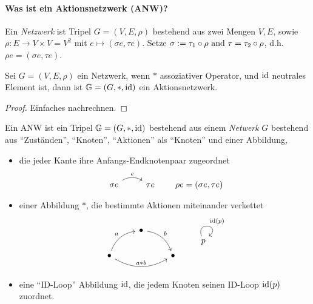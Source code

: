 \paragraph{Was ist ein Aktionsnetzwerk (ANW)?}
\begin{definition}
    Ein \emph{Netzwerk} ist Tripel $G = (V,E,\rho)$ bestehend aus zwei Mengen $V,E$, sowie $\rho \colon E \to V\times V = V^2$ mit $e \mapsto (\sigma e,\tau e)$.
    Setze $\sigma := \tau_1 \circ \rho \text{ and } \tau = \tau_2 \circ \rho$, d.h. $\rho e = (\sigma e, \tau e)$.
\end{definition}
\begin{satz}
    Sei $G = (V,E,\rho)$ ein Netzwerk, wenn $\ast$ assoziativer Operator, und $\operatorname{id}$ neutrales Element ist, dann ist $\mathbb{G} = (G,\ast, \operatorname{id})$ ein Aktionsnetzwerk.
\end{satz}
\begin{proof}
    Einfaches nachrechnen. 
\end{proof}
Ein ANW ist ein Tripel $\mathbb{G} = (G,\ast, \operatorname{id})$ bestehend aus einem \emph{Netwerk} $G$ bestehend aus ``Zuständen'', ``Knoten'', ``Aktionen'' als ``Knoten'' und einer Abbildung, 
\begin{itemize}
    \item die jeder Kante ihre Anfangs-Endknotenpaar zugeordnet
        $$
        \begin{tikzcd}
            \sigma e \arrow[r, "e", bend left] & \tau e
        \end{tikzcd} \qquad\rho e = (\sigma e , \tau e)
        $$
    \item einer Abbildung $\ast$, die bestimmte Aktionen miteinander verkettet
        $$
        \begin{tikzcd}                                        & \bullet \arrow[rd, "b", bend left] &         \\
            \bullet \arrow[ru, "a", bend left] \arrow[rr, "a \ast b", bend right] &                                    & \bullet
        \end{tikzcd} \qquad
        \begin{tikzcd}
            p \arrow["\id(p)", loop, distance=2em, in=40, out=110]
        \end{tikzcd}
        $$
    \item eine ``ID-Loop'' Abbildung $\operatorname{id}$, die jedem Knoten seinen ID-Loop $\operatorname{id}(p)$ zuordnet.
\end{itemize}
